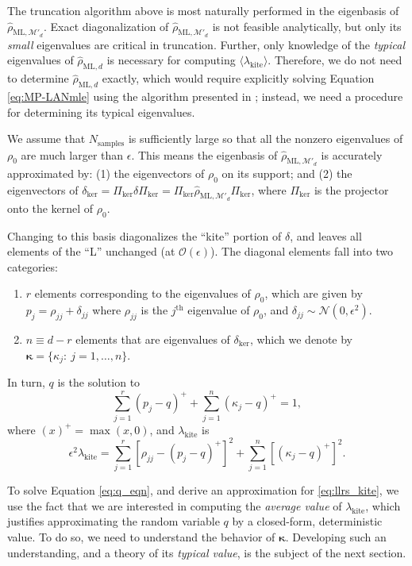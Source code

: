 \documentclass[aps,pra, twocolumn]{revtex4-1}
\newcommand{\M}{\mathcal{M}}
\newcommand{\bvec}[1]{\boldsymbol{#1}}
\newcommand{\rhohat}{\hat{\rho}}
\newcommand{\rhoML}[1]{\rhohat_{\scriptscriptstyle{\mathrm{ML},#1}}}
\begin{document}
The truncation algorithm above is most naturally performed in the eigenbasis of $\rhoML{\M'_{d}}$.  Exact diagonalization of $\rhoML{\M'_{d}}$ is not feasible analytically, but only its \emph{small} eigenvalues are critical in truncation. Further, only knowledge of the \emph{typical} eigenvalues of $\rhoML{d}$ is necessary for computing $\langle \lambda_{\mathrm{kite}}\rangle$. Therefore, we do not need to determine $\rhoML{d}$ exactly, which would require explicitly solving Equation \eqref{eq:MP-LANmle} using the algorithm presented in \cite{Smolin2012}; instead, we need a procedure for determining its typical eigenvalues.

We assume that $N_{\mathrm{samples}}$ is sufficiently large so that all the nonzero eigenvalues of $\rho_0$ are much larger than $\epsilon$. This means the eigenbasis of $\rhoML{\M'_{d}}$ is accurately approximated by: (1) 
the eigenvectors of $\rho_0$ on its support; and (2) the eigenvectors of $\delta_{\mathrm{ker}} = \Pi_{\mathrm{ker}}\delta\Pi_{\mathrm{ker}} = \Pi_{\mathrm{ker}}\rhoML{\M'_{d}}\Pi_{\mathrm{ker}}$, where $\Pi_{\mathrm{ker}}
$ is the projector onto the kernel of $\rho_0$.

Changing to this basis diagonalizes the ``kite'' portion of $\delta$, and leaves all elements of the ``L'' unchanged (at $\mathcal{O}(\epsilon)$).  The diagonal elements fall into two categories:
\begin{enumerate}[noitemsep]
\item $r$ elements corresponding to the eigenvalues of $\rho_0$, which are given by $p_{j} = \rho_{jj} + \delta_{jj}$ where  $\rho_{jj}$ is the $j^{\mathrm{th}}$ eigenvalue of $\rho_{0}$, and $\delta_{jj} \sim \mathcal{N}(0,\epsilon^2)$.
\item $n \equiv d-r$ elements that are eigenvalues of $\delta_{\mathrm{ker}}$, which we denote by $\bvec{\kappa} = \{\kappa_j:~j = 1,\ldots, 
n\}$.
\end{enumerate}
In turn, $q$ is the solution to
\begin{equation}
\label{eq:q_eqn}
 \sum_{j=1}^{r}(p_j - q)^{+} + \sum_{j=1}^{n}{(\kappa_j-q)^+} = 1,
\end{equation}
where $(x)^{+} = \max(x, 0)$, and $\lambda_{\mathrm{kite}}$ is
\begin{equation}
\label{eq:llrs_kite}
\epsilon^{2}\lambda_{\mathrm{kite}} = \sum_{j=1}^{r}[\rho_{jj}- (p_j-q)^{+}]^2 + \sum_{j=1}^{n}\left[(\kappa_j-q)^+\right]^2.
\end{equation}
 
To solve Equation \eqref{eq:q_eqn}, and derive an approximation for \eqref{eq:llrs_kite}, we use the fact that we are interested in computing the \emph{average value} of $\lambda_{\mathrm{kite}}$, which justifies approximating the random variable $q$ by a closed-form, deterministic value. To do so, we need to understand the behavior of $\bvec{\kappa}$. Developing such an understanding, and a theory of its \emph{typical value}, is the subject of the next section.
\end{document}

